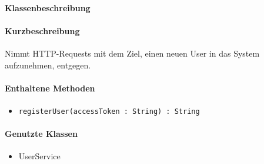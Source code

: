 \paragraph*{Klassenbeschreibung}%
\paragraph*{Kurzbeschreibung}
Nimmt HTTP-Requests mit dem Ziel, einen neuen User in das System aufzunehmen, entgegen.
\paragraph*{Enthaltene Methoden}
\begin{itemize}
    \item \texttt{registerUser(accessToken : String) : String}
\end{itemize}
\paragraph*{Genutzte Klassen}
\begin{itemize}
    \item UserService
\end{itemize}
